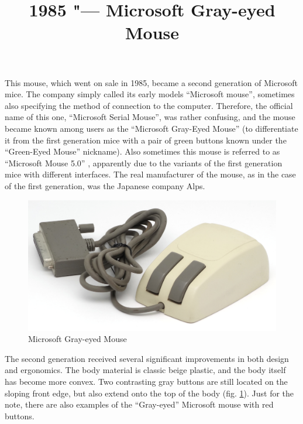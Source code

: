 \documentclass[11pt, a4paper]{article}
\begin{document}
\title{1985 "--- Microsoft Gray-eyed Mouse}
\date{}
\maketitle
{}

This mouse, which went on sale in 1985, became a second generation of Microsoft mice. The company simply called its early models ``Microsoft mouse'', sometimes also specifying the method of connection to the computer. Therefore, the official name of this one, ``Microsoft Serial Mouse'', was rather confusing, and the mouse became known among users as the ``Microsoft Gray-Eyed Mouse'' (to differentiate it from the first generation mice with a pair of green buttons known under the ``Green-Eyed Mouse'' nickname). Also sometimes this mouse is referred to as ``Microsoft Mouse 5.0'' \cite{mouses}, apparently due to the variants of the first generation mice with different interfaces.
The real manufacturer of the mouse, as in the case of the first generation, was the Japanese company Alps.

\begin{figure}[h]
   \centering
    \includegraphics[scale=0.55]{1985_microsoft_gray_eyed_mouse/pic_30.jpg}
    \caption{Microsoft Gray-eyed Mouse}
    \label{fig:MicrosoftGrayEyedPic}
\end{figure}

The second generation received several significant improvements in both design and ergonomics. The body material is classic beige plastic, and the body itself has become more convex. Two contrasting gray buttons are still located on the sloping front edge, but also extend onto the top of the body (fig. \ref{fig:MicrosoftGrayEyedPic}). Just for the note, there are also examples of the ``Gray-eyed'' Microsoft mouse with red buttons.
\end{document}
